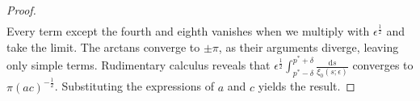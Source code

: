 \documentclass[10pt,a4paper]{amsart}
\begin{document}
\begin{proof}
\begin{align*}
    \end{align*}
    Every term except the fourth and eighth vanishes when we multiply with $\epsilon^{\frac{1}{2}}$ and take the limit. The arctans converge to $\pm\pi$, as their arguments diverge, leaving only simple terms. Rudimentary calculus reveals that $\epsilon^{\frac{1}{2}}\int_{p^*-\delta}^{p^*+\delta}\frac{\mathrm{d}s}{\xi_0(s;\epsilon)}$ converges to $\pi(ac)^{-\frac{1}{2}}$. Substituting the expressions of $a$ and $c$ yields the result.
\end{proof}
\end{document}
